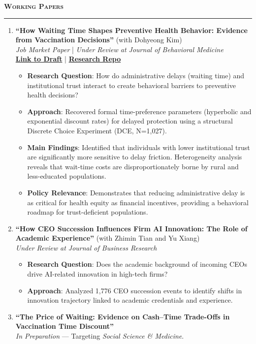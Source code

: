 \documentclass[11pt, letterpaper]{article}
\newcommand{\ressection}[1]{
    \vspace{10pt}
    \noindent\textbf{\large \textsc{#1}}
    \vspace{-2pt}
    \hrule
    \vspace{5pt}
}
\begin{document}
\ressection{Working Papers}
\begin{enumerate}
    \item \textbf{``How Waiting Time Shapes Preventive Health Behavior: Evidence from Vaccination Decisions''} (with Dohyeong Kim) \\
    \textit{Job Market Paper} \quad | \quad \textit{Under Review at Journal of Behavioral Medicine} \\
    \href{https://yichao2022.github.io/jmp.pdf}{\textbf{Link to Draft}} \quad | \quad \href{https://github.com/yichao2022/jmp_repo_draft}{\textbf{Research Repo}}
    \begin{itemize}
        \item \textbf{Research Question}: How do administrative delays (waiting time) and institutional trust interact to create behavioral barriers to preventive health decisions?
        \item \textbf{Approach}: Recovered formal time-preference parameters (hyperbolic and exponential discount rates) for delayed protection using a structural Discrete Choice Experiment (DCE, N=1,027).
        \item \textbf{Main Findings}: Identified that individuals with lower institutional trust are significantly more sensitive to delay friction. Heterogeneity analysis reveals that wait-time costs are disproportionately borne by rural and less-educated populations.
        \item \textbf{Policy Relevance}: Demonstrates that reducing administrative delay is as critical for health equity as financial incentives, providing a behavioral roadmap for trust-deficient populations.
    \end{itemize}

    \item \textbf{``How CEO Succession Influences Firm AI Innovation: The Role of Academic Experience''} (with Zhimin Tian and Yu Xiang) \\
    \textit{Under Review at Journal of Business Research}
    \begin{itemize}
        \item \textbf{Research Question}: Does the academic background of incoming CEOs drive AI-related innovation in high-tech firms?
        \item \textbf{Approach}: Analyzed 1,776 CEO succession events to identify shifts in innovation trajectory linked to academic credentials and experience.
    \end{itemize}

    \item \textbf{``The Price of Waiting: Evidence on Cash--Time Trade-Offs in Vaccination Time Discount''} \\
    \textit{In Preparation} --- Targeting \textit{Social Science \& Medicine}.
\end{enumerate}
\end{document}
